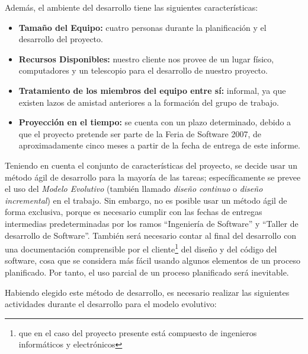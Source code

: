 \documentclass[letterpaper,spanish,10pt]{article}
\begin{document}
Adem\'as, el ambiente del desarrollo tiene las siguientes caracter\'isticas:

\begin{itemize}
\item \textbf{Tama\~no del Equipo:} cuatro personas durante la planificaci\'on y el 
  desarrollo del proyecto.
\item \textbf{Recursos Disponibles:} nuestro cliente nos provee de un lugar f\'isico, 
  computadores y un telescopio para el desarrollo de nuestro proyecto.
\item \textbf{Tratamiento de los miembros del equipo entre s\'i:} informal, ya
  que existen lazos de amistad anteriores a la formaci\'on del grupo de trabajo.
\item \textbf{Proyecci\'on en el tiempo:} se cuenta con un plazo determinado,
  debido a que el proyecto pretende ser parte de la Feria de Software 2007, 
  de aproximadamente cinco meses a partir de la fecha de entrega de este informe.
\end{itemize}





Teniendo en cuenta el conjunto de caracter\'isticas del proyecto, se
decide usar un m\'etodo \'agil de desarrollo para la
mayor\'ia de las tareas; espec\'ificamente se prevee el uso del \emph{Modelo
Evolutivo} (tambi\'en llamado \emph{dise\~no continuo} o \emph{dise\~no
incremental}) en el trabajo. Sin embargo, no es posible
usar un m\'etodo \'agil de forma exclusiva, porque es necesario cumplir con
las fechas de entregas intermedias predeterminadas por los ramos
``Ingenier\'ia de Software'' y ``Taller de desarrollo de Software''.
Tambi\'en ser\'a necesario contar al final del desarrollo con una
documentaci\'on comprensible por el cliente\footnote{que en el caso del
  proyecto presente est\'a compuesto de ingenieros inform\'aticos y
  electr\'onicos} del dise\~no y del c\'odigo del software, cosa que se
considera m\'as f\'acil usando algunos elementos de un proceso planificado.
Por
tanto, el uso parcial de un proceso planificado ser\'a inevitable.

Habiendo elegido este m\'etodo de desarrollo, es necesario realizar las
siguientes actividades durante el desarrollo para el modelo evolutivo:
\end{document}

